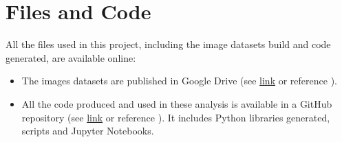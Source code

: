 
\chapter{Files and Code}

\label{FilesCode}

All the files used in this project, including the image datasets build and code generated, are available online:

\begin{itemize}

	\item The images datasets are published in Google Drive (see \href{https://drive.google.com/open?id=1Hjod1ZTuSIW3VNO2IuGoq_iagI3imnJQ}{link} or reference \parencite{datasets}).
	
	\item All the code produced and used in these analysis is available in a GitHub repository (see \href{https://github.com/peterweber85/MasterThesis}{link} or reference \parencite{github}). It includes Python libraries generated, scripts and Jupyter Notebooks.

\end{itemize}

